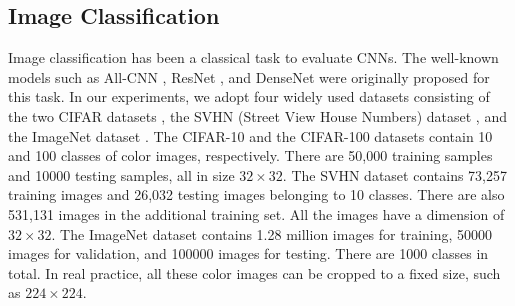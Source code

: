 \documentclass[10pt, conference, letterpaper]{IEEEtran}
\begin{document}
\subsection{Image Classification}
Image classification has been a classical task to evaluate CNNs. The well-known models such as All-CNN \cite{springenberg2014striving}, ResNet \cite{he2016deep}, and DenseNet \cite{huang2017densely} were originally proposed for this task. In our experiments, we adopt four widely used datasets consisting of the two CIFAR datasets \cite{krizhevsky2009learning}, the SVHN (Street View House Numbers) dataset \cite{netzer2011reading}, and the ImageNet dataset \cite{deng2009imagenet}. The CIFAR-10 and the  CIFAR-100 datasets contain 10 and 100 classes of color images, respectively. There are 50,000 training samples and 10000 testing samples, all in size $32\times32$. The SVHN dataset contains 73,257 training images and 26,032 testing images belonging to 10 classes. There are also 531,131 images in the additional training set. All the images have a dimension of $32\times32$. The ImageNet dataset contains 1.28 million images for training, 50000 images for validation, and 100000 images for testing. There are 1000 classes in total. In real practice, all these color images can be cropped to a fixed size, such as $224 \times 224$.

\end{document}
